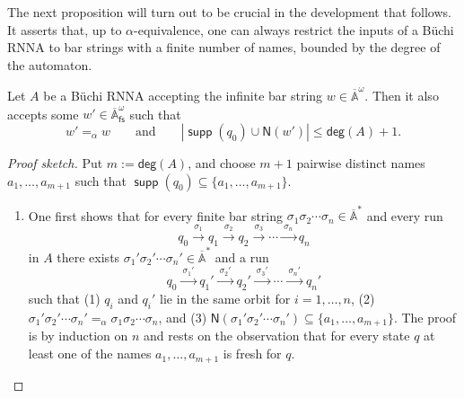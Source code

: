 \documentclass[10pt,a4paper]{amsart}
\newcommand{\Names}[1]{\mathsf{N}(#1)}
\newcommand{\degree}{\mathsf{deg}}
\newcommand{\barA}{\overline{\names}}
\numberwithin{equation}{section}
\newcommand{\xto}[1]{\xrightarrow{~#1~}}
\newcommand{\seq}{\subseteq}
\newcommand{\fs}{\mathsf{fs}}
\newcommand{\+}[1]{\mathcal{#1}\xspace}
\newcommand{\names}{\mathbb{A}}
\DeclareMathOperator{\supp}{\mathsf{supp}} %
\theoremstyle{definition}
\begin{document}
\noindent The next proposition will turn out to be crucial in the development that follows. It asserts that, up to $\alpha$-equivalence, one can always restrict the inputs of a Büchi RNNA to bar strings with a finite number of names, bounded by the degree of the automaton.
\begin{proposition}\label{lem:restrict_num_names}
  Let $A$ be a Büchi RNNA accepting the infinite bar string $w\in
  \barA^\omega$. Then it also accepts some $w'\in \barA^\omega_\fs$ such
  that
  \[
    w'=_\alpha w
    \qquad\text{and}\qquad
    |\supp (q_0) \cup \Names{w'}|\leq \degree(A)+1.
  \]
\end{proposition}
%
\begin{proof}[Proof sketch]
  Put $m:=\degree(A)$, and choose $m+1$ pairwise distinct names $a_1,\ldots, a_{m+1}$ such that $\supp(q_0)\seq \{a_1,\ldots, a_{m+1}\}$. 

\begin{enumerate} \item One first shows that for every finite bar string $\sigma_1\sigma_2\cdots \sigma_n\in \barA^*$ and every run
\[ q_0\xto{\sigma_1} q_1\xto{\sigma_2} q_2 \xto{\sigma_3} \cdots \xto{\sigma_n} q_n\]
in $A$ there exists $\sigma_1'\sigma_2'\cdots \sigma_n'\in \barA^*$ and a run
  \begin{equation}\label{eq:runparsketch}
    q_0 \xto{\sigma_1'} q_1' \xto{\sigma_2'} q_2' \xto{\sigma_3'} \cdots
    \xto{\sigma_n'} q_n'
  \end{equation}
such that (1) $q_i$ and $q_i'$ lie in the same orbit for $i=1,\ldots, n$, (2) $\sigma_1'\sigma_2'\cdots \sigma_n' =_\alpha \sigma_1\sigma_2\cdots \sigma_n$, and (3) $\Names{\sigma_1'\sigma_2'\cdots \sigma_n'}\seq \{a_1,\ldots, a_{m+1}\}$. The proof is by induction on $n$ and rests on the observation that for every state $q$ at least one of the names $a_1,\ldots, a_{m+1}$ is fresh for $q$. 



\end{enumerate}
\end{proof}
\end{document}
